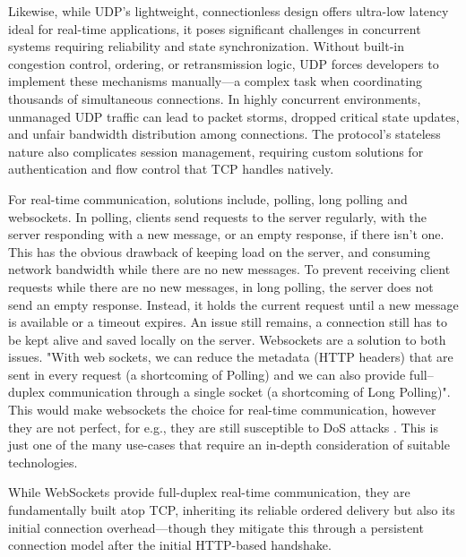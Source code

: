 \documentclass[]{final}
\begin{document}
Likewise, while UDP's lightweight, connectionless design offers ultra-low
latency ideal for real-time applications, it poses significant challenges
in concurrent systems requiring reliability and state synchronization. Without
built-in
congestion control, ordering, or retransmission logic, UDP forces developers to
implement these mechanisms manually—a complex task when coordinating thousands
of simultaneous connections. In highly concurrent environments, unmanaged
UDP traffic can lead to
packet storms, dropped critical state updates, and unfair bandwidth
distribution among connections. The protocol's stateless nature also
complicates session management, requiring custom solutions for authentication
and flow control that TCP handles natively.

For
real-time communication, solutions include, polling, long polling and websockets. In polling,
clients send requests to the server regularly, with the server responding with a new message, or
an empty response, if there isn't one. This has the obvious drawback of keeping load on the server,
and consuming network bandwidth while there are no new messages. To prevent receiving client requests
while there are no new messages, in long polling, the server does not send an empty response. Instead,
it holds the current request until a new message is available or a timeout expires. An issue still remains,
a connection still has to be kept alive and saved locally on the server. Websockets are a
solution to both issues. "With web sockets, we can reduce the metadata (HTTP headers) that are sent in
every request (a shortcoming of Polling) and we can also provide full–duplex communication through a
single socket (a shortcoming of Long Polling)". This would make websockets the choice for real-time
communication, however they are not perfect, for e.g., they are still susceptible to DoS attacks
\cite{gupta_overview_2018}. This is just one of the many use-cases that require an in-depth consideration
of suitable technologies.


While WebSockets provide full-duplex real-time communication, they are
fundamentally built atop TCP, inheriting its reliable ordered delivery but
also its initial connection overhead—though they mitigate this through a
persistent connection model after the initial HTTP-based handshake.
\end{document}
